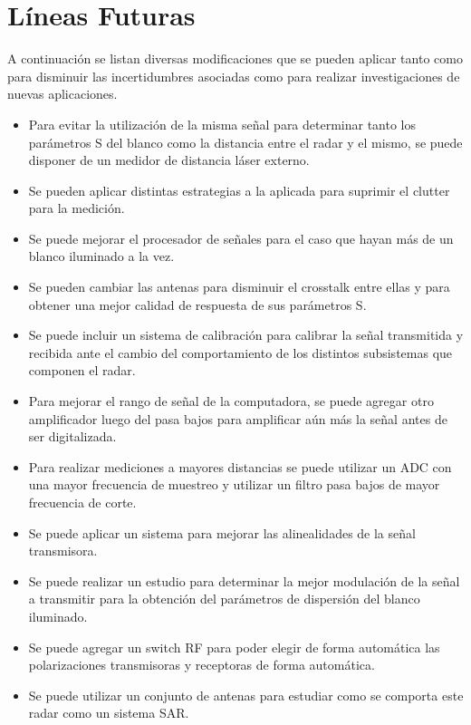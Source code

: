 \chapter{Líneas Futuras} \label{ch:futureWork}

\ifpdf
    \graphicspath{{Chapter6/Figs/Raster/}{Chapter6/Figs/PDF/}{Chapter6/Figs/}}
\else
    \graphicspath{{Chapter6/Figs/Vector/}{Chapter6/Figs/}}
\fi

A continuación se listan diversas modificaciones que se pueden aplicar tanto como para disminuir las incertidumbres asociadas como para realizar investigaciones de nuevas aplicaciones.

\begin{itemize}
    \item Para evitar la utilización de la misma señal para determinar tanto los parámetros S del blanco como la distancia entre el radar y el mismo, se puede disponer de un medidor de distancia láser externo.
    \item Se pueden aplicar distintas estrategias a la aplicada para suprimir el clutter para la medición.
    \item Se puede mejorar el procesador de señales para el caso que hayan más de un blanco iluminado a la vez.
    \item Se pueden cambiar las antenas para disminuir el crosstalk entre ellas y para obtener una mejor calidad de respuesta de sus parámetros S.
    \item Se puede incluir un sistema de calibración para calibrar la señal transmitida y recibida ante el cambio del comportamiento de los distintos subsistemas que componen el radar.
    \item Para mejorar el rango de señal de la computadora, se puede agregar otro amplificador luego del pasa bajos para amplificar aún más la señal antes de ser digitalizada.
    \item Para realizar mediciones a mayores distancias se puede utilizar un ADC con una mayor frecuencia de muestreo y utilizar un filtro pasa bajos de mayor frecuencia de corte.
    \item Se puede aplicar un sistema para mejorar las alinealidades de la señal transmisora.
    \item Se puede realizar un estudio para determinar la mejor modulación de la señal a transmitir para la obtención del parámetros de dispersión del blanco iluminado.
    \item Se puede agregar un switch RF para poder elegir de forma automática las polarizaciones transmisoras y receptoras de forma automática.
    \item Se puede utilizar un conjunto de antenas para estudiar como se comporta este radar como un sistema SAR.
\end{itemize}
